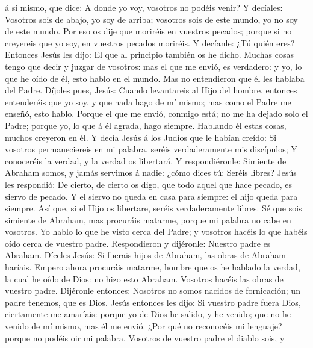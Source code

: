 á sí mismo, que dice: A donde yo voy, vosotros no podéis venir?
 Y decíales: Vosotros sois de abajo, yo soy de arriba;
vosotros sois de este mundo, yo no soy de este mundo. 
Por eso os dije que moriréis en vuestros pecados; porque si no creyereis
que yo soy, en vuestros pecados moriréis.  Y decíanle:
¿Tú quién eres? Entonces Jesús les dijo: El que al principio también os
he dicho.  Muchas cosas tengo que decir y juzgar de
vosotros: mas el que me envió, es verdadero: y yo, lo que he oído de él,
esto hablo en el mundo.  Mas no entendieron que él les
hablaba del Padre.  Díjoles pues, Jesús: Cuando
levantareis al Hijo del hombre, entonces entenderéis que yo soy, y que
nada hago de mí mismo; mas como el Padre me enseñó, esto hablo.
 Porque el que me envió, conmigo está; no me ha dejado
solo el Padre; porque yo, lo que á él agrada, hago siempre.
 Hablando él estas cosas, muchos creyeron en él.
 Y decía Jesús á los Judíos que le habían creído: Si
vosotros permaneciereis en mi palabra, seréis verdaderamente mis
discípulos;  Y conoceréis la verdad, y la verdad os
libertará.  Y respondiéronle: Simiente de Abraham somos,
y jamás servimos á nadie: ¿cómo dices tú: Seréis libres? 
Jesús les respondió: De cierto, de cierto os digo, que todo aquel que
hace pecado, es siervo de pecado.  Y el siervo no queda
en casa para siempre: el hijo queda para siempre.  Así
que, si el Hijo os libertare, seréis verdaderamente libres.
 Sé que sois simiente de Abraham, mas procuráis matarme,
porque mi palabra no cabe en vosotros.  Yo hablo lo que
he visto cerca del Padre; y vosotros hacéis lo que habéis oído cerca de
vuestro padre.  Respondieron y dijéronle: Nuestro padre
es Abraham. Díceles Jesús: Si fuerais hijos de Abraham, las obras de
Abraham haríais.  Empero ahora procuráis matarme, hombre
que os he hablado la verdad, la cual he oído de Dios: no hizo esto
Abraham.  Vosotros hacéis las obras de vuestro padre.
Dijéronle entonces: Nosotros no somos nacidos de fornicación; un padre
tenemos, que es Dios.  Jesús entonces les dijo: Si
vuestro padre fuera Dios, ciertamente me amaríais: porque yo de Dios he
salido, y he venido; que no he venido de mí mismo, mas él me envió.
 ¿Por qué no reconocéis mi lenguaje? porque no podéis oir
mi palabra.  Vosotros de vuestro padre el diablo sois, y
